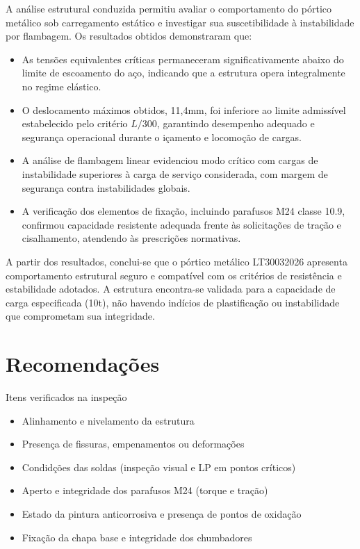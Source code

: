 \documentclass[12pt, a4paper]{article}
\begin{document}
A análise estrutural conduzida permitiu avaliar o comportamento do pórtico metálico sob
carregamento estático e investigar sua suscetibilidade à instabilidade por flambagem. Os
resultados obtidos demonstraram que:

\begin{itemize}
    \item As tensões equivalentes críticas permaneceram significativamente abaixo do
    limite de escoamento do aço, indicando que a estrutura opera integralmente     no regime elástico.
    
    \item O deslocamento máximos obtidos, 11,4mm, foi inferiore ao limite admissível estabelecido pelo critério $L/300$, garantindo desempenho adequado e segurança operacional durante o içamento e locomoção de cargas.
    
    \item A análise de flambagem linear evidenciou modo crítico com cargas de instabilidade superiores à carga de serviço considerada,  com margem de segurança contra instabilidades globais.
    
    \item A verificação dos elementos de fixação, incluindo parafusos M24 classe 10.9, confirmou capacidade resistente adequada frente às solicitações de tração e cisalhamento,
    atendendo às prescrições normativas.
\end{itemize}

A partir dos resultados, conclui-se que o pórtico metálico LT30032026 apresenta comportamento estrutural seguro e compatível com os critérios de resistência e estabilidade adotados. A estrutura encontra-se validada para a capacidade de carga
especificada (10t), não havendo indícios de plastificação ou instabilidade que comprometam sua integridade.





\section{Recomendações}
Itens verificados na inspeção 
\begin{itemize}
    \item Alinhamento e nivelamento da estrutura
    \item Presença de fissuras, empenamentos ou deformações
    \item Condidções das soldas (inspeção visual e LP em pontos críticos)
    \item Aperto e integridade dos parafusos M24 (torque e tração)
    \item Estado da pintura anticorrosiva e presença de pontos de oxidação
    \item Fixação da chapa base e integridade dos chumbadores
\end{itemize}
\end{document}
